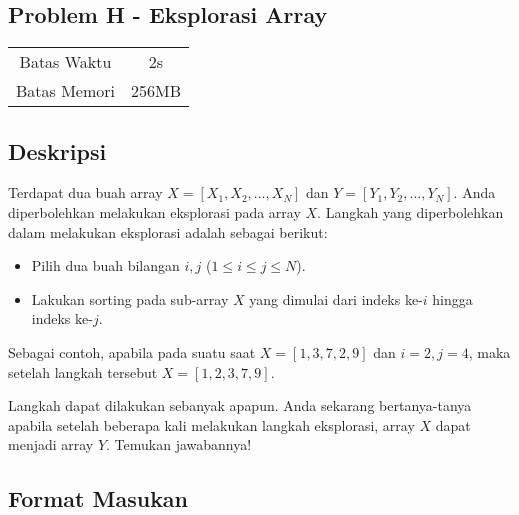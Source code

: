 \documentclass{article}
\begin{document}
\begin{center}
    \section*{Problem H - Eksplorasi Array} %

    \begin{tabular}{ | c c | }
        \hline
        Batas Waktu  & 2s \\    %
        Batas Memori & 256MB \\  %
        \hline
    \end{tabular}
\end{center}

\subsection*{Deskripsi}

Terdapat dua buah array $X = [X_1, X_2, \dots, X_N]$ dan $Y = [Y_1, Y_2, \dots, Y_N]$.
Anda diperbolehkan melakukan eksplorasi pada array $X$. Langkah yang diperbolehkan dalam melakukan eksplorasi adalah sebagai berikut:

\begin{itemize}
    \item Pilih dua buah bilangan $i, j$ ($1 \le i \le j \le N$).
    \item Lakukan sorting pada sub-array $X$ yang dimulai dari indeks ke-$i$ hingga indeks ke-$j$.
\end{itemize}

Sebagai contoh, apabila pada suatu saat $X = [1, 3, 7, 2, 9]$ dan $i = 2, j = 4$, maka setelah langkah tersebut $X = [1, 2, 3, 7, 9]$.

Langkah dapat dilakukan sebanyak apapun. Anda sekarang bertanya-tanya apabila setelah beberapa kali melakukan langkah eksplorasi, array $X$ dapat menjadi array $Y$. Temukan jawabannya!

\subsection*{Format Masukan}



\end{document}
